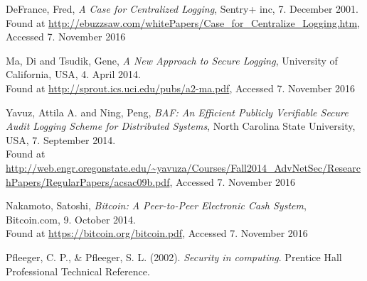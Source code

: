 
\begin{thebibliography}{9}

  DeFrance, Fred,
  \emph{A Case for Centralized Logging},
  Sentry+ inc,
  7. December 2001.\\
  Found at
  \url{http://ebuzzsaw.com/whitePapers/Case_for_Centralize_Logging.htm},
  Accessed 7. November 2016

  Ma, Di and Tsudik, Gene,
  \emph{A New Approach to Secure Logging},
  University of California, USA,
  4. April 2014.\\
  Found at
  \url{http://sprout.ics.uci.edu/pubs/a2-ma.pdf},
  Accessed 7. November 2016

  Yavuz, Attila A. and Ning, Peng,
  \emph{BAF: An Efficient Publicly Verifiable Secure Audit
  Logging Scheme for Distributed Systems},
  North Carolina State University, USA,
  7. September 2014.\\
  Found at
  \url{http://web.engr.oregonstate.edu/~yavuza/Courses/Fall2014_AdvNetSec/ResearchPapers/RegularPapers/acsac09b.pdf},
  Accessed 7. November 2016

  Nakamoto, Satoshi,
  \emph{Bitcoin: A Peer-to-Peer Electronic Cash System},
  Bitcoin.com,
  9. October 2014.\\
  Found at
  \url{https://bitcoin.org/bitcoin.pdf},
  Accessed 7. November 2016
  
Pfleeger, C. P., \& Pfleeger, S. L. (2002). \textit{Security in computing}. Prentice Hall Professional Technical Reference.
  

\end{thebibliography}
